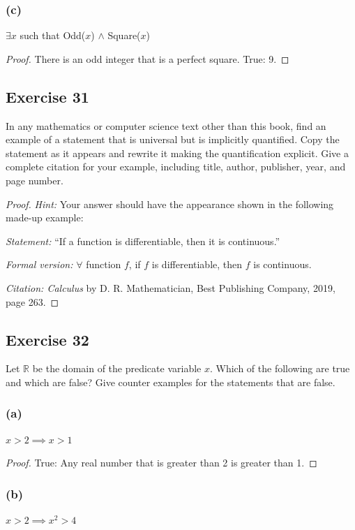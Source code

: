 \documentclass[14pt]{extarticle}
\newcommand{\R}{\mathbb{R}}
\newcommand{\fa}{\forall}
\newcommand{\te}{\exists}
\begin{document}
\subsubsection{(c)}
$\te x$ such that Odd($x$) $\wedge$ Square($x$)

\begin{proof}
There is an odd integer that is a perfect square. True: 9.
\end{proof}

\subsection{Exercise 31}
In any mathematics or computer science text other than this book, find an example of a statement that is universal but is implicitly quantified. Copy the statement as it appears and rewrite it making the quantification explicit. Give a complete citation for your example, including title, author, publisher, year, and page number.

\begin{proof}
{\it Hint:} Your answer should have the appearance shown in
the following made-up example:

{\it Statement:} “If a function is differentiable, then it is continuous.”

{\it Formal version:} $\fa$ function $f$, if $f$ is differentiable, then $f$ is continuous.

{\it Citation: Calculus} by D. R. Mathematician, Best Publishing Company, 2019, page 263.
\end{proof}

\subsection{Exercise 32}
Let $\R$ be the domain of the predicate variable $x$. Which of the following are true and which are false? Give counter examples for the statements that are false.

\subsubsection{(a)}
$x > 2 \implies x > 1$

\begin{proof}
True: Any real number that is greater than 2 is greater than 1.
\end{proof}

\subsubsection{(b)}
$x > 2 \implies x^2 > 4$
\end{document}
